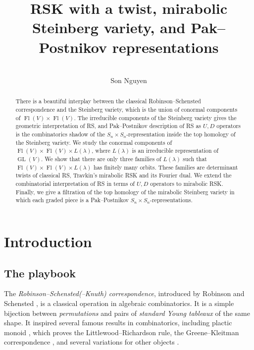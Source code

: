 \documentclass[12pt,a4paper]{article}
\title{\vspace{-1em} 
\textbf{RSK with a twist, mirabolic Steinberg variety, and Pak--Postnikov representations}}
\author{\vspace{-2em} \\
Son Nguyen}
\date{\vspace{-3em}}
\def\Fl{\operatorname{Fl}}
\def\GL{\operatorname{GL}}
\def\FlVV{\Fl(V) \times \Fl(V)}
\theoremstyle{plain}
\theoremstyle{definition}
\theoremstyle{remark}
\begin{document}

\maketitle

    \begin{abstract}
        There is a beautiful interplay between the classical Robinson--Schensted correspondence and the Steinberg variety, which is the union of conormal components of $\FlVV$. The irreducible components of the Steinberg variety gives the geometric interpretation of RS, and Pak--Postnikov description of RS as $U,D$ operators is the combinatorics shadow of the $S_n\times S_n$-representation inside the top homology of the Steinberg variety. We study the conormal components of $\FlVV\times L(\lambda)$, where $L(\lambda)$ is an irreducible representation of $\GL(V)$. We show that there are only three families of $L(\lambda)$ such that $\FlVV \times L(\lambda)$ has finitely many orbits. These families are determinant twists of classical RS, Travkin's mirabolic RSK and its Fourier dual. We extend the combinatorial interpretation of RS in terms of $U,D$ operators to mirabolic RSK. Finally, we give a filtration of the top homology of the mirabolic Steinberg variety in which each graded piece is a Pak--Postnikov $S_n \times S_n$-representations.
    \end{abstract}

\tableofcontents


\section{Introduction}

\subsection{The playbook}

    The \textit{Robinson--Schensted(--Knuth) correspondence}, introduced by Robinson \cite{robinson1938representations} and Schensted \cite{schensted1961longest}, is a classical operation in algebraic combinatorics. It is a simple bijection between \textit{permutations} and pairs of \textit{standard Young tableaux} of the same shape. It inspired several famous results in combinatorics, including plactic monoid \cite{fulton1997young}, which proves the Littlewood--Richardson rule, the Greene--Kleitman correspondence \cite{greene1976structure}, and several variations for other objects \cite{edelman1987balanced, tracy2004limit, haiman1989mixed,thomas2011longest,huang2022row,huang2022bumpless}.
\end{document}
